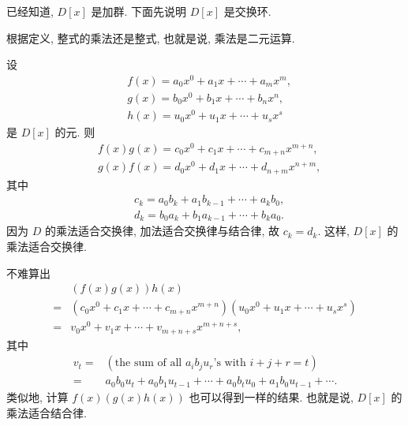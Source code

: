 \begin{pf}
    已经知道, $D[x]$ 是加群. 下面先说明 $D[x]$ 是交换环.

    根据定义, 整式的乘法还是整式, 也就是说, 乘法是二元运算.

    设
    \begin{align*}
         & f(x) = a_0 x^0 + a_1 x + \cdots + a_m x^m, \\
         & g(x) = b_0 x^0 + b_1 x + \cdots + b_n x^n, \\
         & h(x) = u_0 x^0 + u_1 x + \cdots + u_s x^s
    \end{align*}
    是 $D[x]$ 的元. 则
    \begin{align*}
         & f(x) g(x) = c_0 x^0 + c_1 x + \cdots + c_{m+n} x^{m+n}, \\
         & g(x) f(x) = d_0 x^0 + d_1 x + \cdots + d_{n+m} x^{n+m},
    \end{align*}
    其中
    \begin{align*}
         & c_k = a_0 b_k + a_1 b_{k-1} + \cdots + a_k b_0, \\
         & d_k = b_0 a_k + b_1 a_{k-1} + \cdots + b_k a_0.
    \end{align*}
    因为 $D$ 的乘法适合交换律, 加法适合交换律与结合律, 故 $c_k = d_k$. 这样, $D[x]$ 的乘法适合交换律.

    不难算出
    \begin{align*}
             & (f(x) g(x)) h(x)                                                                  \\
        = {} & (c_0 x^0 + c_1 x + \cdots + c_{m+n} x^{m+n}) (u_0 x^0 + u_1 x + \cdots + u_s x^s) \\
        = {} & v_0 x^0 + v_1 x + \cdots + v_{m+n+s} x^{m+n+s},
    \end{align*}
    其中
    \begin{align*}
        v_t
        = {} & (\text{the sum of all $a_i b_j u_r$'s with $i+j+r=t$})                           \\
        = {} & a_0 b_0 u_t + a_0 b_1 u_{t-1} + \cdots + a_0 b_t u_0 + a_1 b_0 u_{t-1} + \cdots.
    \end{align*}
    类似地, 计算 $f(x) (g(x) h(x))$ 也可以得到一样的结果. 也就是说, $D[x]$ 的乘法适合结合律.


\end{pf}
